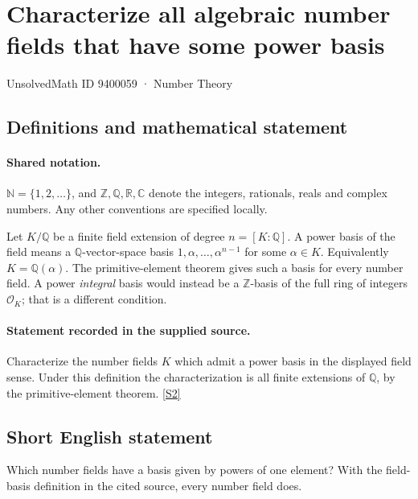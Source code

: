 \documentclass[11pt]{article}
\newcommand{\sref}[2]{\hyperlink{source:#1:#2}{[S#2]}}
\begin{document}
\setcounter{section}{9400058}
\section{Characterize all algebraic number fields that have some power basis}\label{9400059}
{\small\sffamily UnsolvedMath ID 9400059 · Number Theory}
\subsection{Definitions and mathematical statement}

\paragraph{Shared notation.}$\mathbb N=\{1,2,\ldots\}$, and $\mathbb Z,\mathbb Q,\mathbb R,\mathbb C$ denote the integers, rationals, reals and complex numbers. Any other conventions are specified locally.


Let $K/\mathbb Q$ be a finite field extension of degree $n=[K:\mathbb Q]$. A power basis of the field means a $\mathbb Q$-vector-space basis $1,\alpha,\ldots,\alpha^{n-1}$ for some $\alpha\in K$. Equivalently $K=\mathbb Q(\alpha)$. The primitive-element theorem gives such a basis for every number field. A power \emph{integral} basis would instead be a $\mathbb Z$-basis of the full ring of integers $\mathcal O_K$; that is a different condition.
\paragraph{Statement recorded in the supplied source.}
Characterize the number fields $K$ which admit a power basis in the displayed field sense. Under this definition the characterization is all finite extensions of $\mathbb Q$, by the primitive-element theorem. \sref{9400059}{2}
\subsection{Short English statement}
Which number fields have a basis given by powers of one element? With the field-basis definition in the cited source, every number field does.
\end{document}
